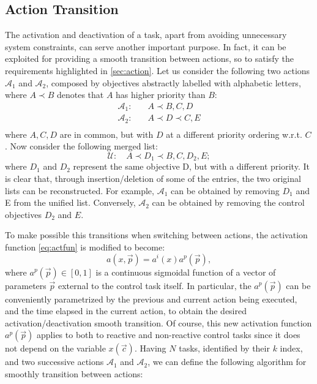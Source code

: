 \subsection{Action Transition}\label{sec:actiontran}
The activation and deactivation of a task, apart from avoiding unnecessary system constraints, can serve another important purpose. In fact, it can be exploited for providing a smooth transition between actions, so to satisfy the requirements highlighted in \ref{sec:action}. 
Let us consider the following two actions $\mathcal{A}_1$ and $\mathcal{A}_2$, composed by objectives abstractly labelled with alphabetic letters, where $A \prec B$ denotes that $A$ has higher priority than $B$:
\begin{equation*}
\begin{aligned}
\mathcal{A}_1:\quad & A \prec B, C, D\\
\mathcal{A}_2:\quad & A \prec D \prec C, E\\
\end{aligned}
\end{equation*}
where $A, C, D$ are in common, but with $D$ at a different priority ordering w.r.t. $C$. Now consider the following merged list:
\begin{equation*}
\mathcal{U}:\quad A \prec D_1 \prec B, C, D_2, E;
\end{equation*}
where $D_1$ and $D_2$ represent the same objective D, but with a different priority.
It is clear that, through insertion/deletion of some of the entries, the two original lists can be reconstructed.
For example, $\mathcal{A}_1$ can be obtained by removing $D_1$ and E from the unified list. Conversely, $\mathcal{A}_2$ can be obtained by removing the
control objectives $D_2$ and $E$.

To make possible this transitions when switching between actions, the activation function \eqref{eq:actfun} is modified to become:
\begin{equation}\label{eq:actfun2}
a(x,\vec{p}) = a^i(x) a^p(\vec{p}),
\end{equation}
where $a^p(\vec{p}) \in [0, 1]$ is a continuous sigmoidal function of a vector of parameters $\vec{p}$ external to the control task itself. In particular, the $a^p(\vec{p})$ can be conveniently parametrized by the previous and current action being executed, and the time elapsed in the current action, to obtain the desired activation/deactivation smooth transition. Of course, this new activation function $a^p(\vec{p})$  applies to both to reactive and non-reactive control tasks since it does not depend on the variable $x(\vec{c})$. 
Having $N$ tasks, identified by their $k$ index, and two successive actions  $\mathcal{A}_1$ and  $\mathcal{A}_2$, we can define the following algorithm for smoothly transition between actions:

